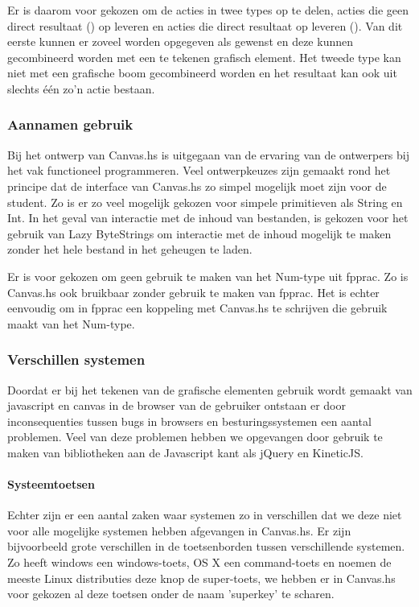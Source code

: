 Er is daarom voor gekozen om de acties in twee types op te delen, acties die geen direct resultaat () op leveren en acties die direct resultaat op leveren (). Van dit eerste kunnen er zoveel worden opgegeven als gewenst en deze kunnen gecombineerd worden met een te tekenen grafisch element. Het tweede type kan niet met een grafische boom gecombineerd worden en het resultaat kan ook uit slechts één zo'n actie bestaan. 

\subsubsection{Aannamen gebruik}
Bij het ontwerp van Canvas.hs is uitgegaan van de ervaring van de ontwerpers bij het vak functioneel programmeren. Veel ontwerpkeuzes zijn gemaakt rond het principe dat de interface van Canvas.hs zo simpel mogelijk moet zijn voor de student. Zo is er zo veel mogelijk gekozen voor simpele primitieven als String en Int. In het geval van interactie met de inhoud van bestanden, is gekozen voor het gebruik van Lazy ByteStrings om interactie met de inhoud mogelijk te maken zonder het hele bestand in het geheugen te laden.

Er is voor gekozen om geen gebruik te maken van het Num-type uit fpprac. Zo is Canvas.hs ook bruikbaar zonder gebruik te maken van fpprac. Het is echter eenvoudig om in fpprac een koppeling met Canvas.hs te schrijven die gebruik maakt van het Num-type.

\subsubsection{Verschillen systemen}
Doordat er bij het tekenen van de grafische elementen gebruik wordt gemaakt van javascript en canvas in de browser van de gebruiker ontstaan er door inconsequenties tussen bugs in browsers en besturingssystemen een aantal problemen. Veel van deze problemen hebben we opgevangen door gebruik te maken van bibliotheken aan de Javascript kant als jQuery en KineticJS. 

\paragraph{Systeemtoetsen} Echter zijn er een aantal zaken waar systemen zo in verschillen dat we deze niet voor alle mogelijke systemen hebben afgevangen in Canvas.hs. Er zijn bijvoorbeeld grote verschillen in de toetsenborden tussen verschillende systemen. Zo heeft windows een windows-toets, OS X een command-toets en noemen de meeste Linux distributies deze knop de super-toets, we hebben er in Canvas.hs voor gekozen al deze toetsen onder de naam 'superkey' te scharen.


